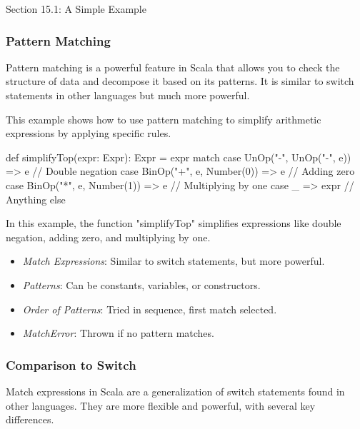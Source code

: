 \begin{notes}{Section 15.1: A Simple Example}
\begin{highlight}
    \end{highlight}
    
    \subsubsection*{Pattern Matching}
    
    Pattern matching is a powerful feature in Scala that allows you to check the structure of data and decompose it based on its patterns. It is similar to switch statements in other languages but 
    much more powerful. 
    
    \begin{highlight}
    
    This example shows how to use pattern matching to simplify arithmetic expressions by applying specific rules.
    
    \begin{code}[Scala]
    def simplifyTop(expr: Expr): Expr = expr match {
      case UnOp("-", UnOp("-", e)) => e        // Double negation
      case BinOp("+", e, Number(0)) => e       // Adding zero
      case BinOp("*", e, Number(1)) => e       // Multiplying by one
      case _ => expr                           // Anything else
    }
    \end{code}
    
    In this example, the function "simplifyTop" simplifies expressions like double negation, adding zero, and multiplying by one.
    
    \begin{itemize}
        \item \textit{Match Expressions}: Similar to switch statements, but more powerful.
        \item \textit{Patterns}: Can be constants, variables, or constructors.
        \item \textit{Order of Patterns}: Tried in sequence, first match selected.
        \item \textit{MatchError}: Thrown if no pattern matches.
    \end{itemize}
    
    \end{highlight}
    
    \subsubsection*{Comparison to Switch}
    
    Match expressions in Scala are a generalization of switch statements found in other languages. They are more flexible and powerful, with several key differences.
    

\end{notes}
